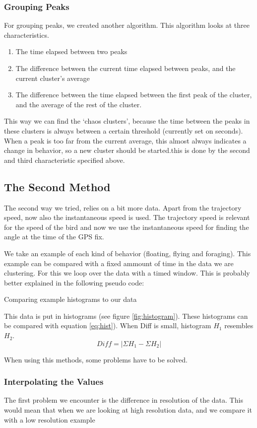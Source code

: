  \subsubsection{Grouping Peaks}
 For grouping peaks, we created another algorithm. This algorithm looks at three
 characteristics.  
 \begin{enumerate}
 \item The time elapsed between two peaks
 \item The difference between the current time elapsed between peaks, and the
 current cluster's average
 \item The difference between the time elapsed between the first peak of the
 cluster, and the average of the rest of the cluster.
 \end{enumerate}
 This way we can find the `chaos clusters', because the time between the peaks
 in these clusters is always between a certain threshold (currently set on
 \timeThreshold seconds). 
 When a peak is too far from the  current average, this almost always indicates
 a change in behavior, so a new cluster should be started.this is done by the
 second and third characteristic specified above.

\subsection{The Second Method}
The second way we tried, relies on a bit more data. Apart from the trajectory
speed, now also the instantaneous speed is used. The trajectory speed is relevant for
the speed of the bird and now we use the instantaneous speed for finding the angle
at the time of the GPS fix. 

We take an example of each kind of behavior (floating, flying and foraging).
This example can be compared with a fixed ammount of time in the data we are
clustering. For this we loop over the data with a timed window. This is probably
better explained in the following pseudo code:

\begin{algorithm}
\begin{algorithmic}
\ENDFOR
\end{algorithmic}
\caption{Comparing example histograms to our data}
\label{alg:hist}
\end{algorithm}


This data is put in histograms (see figure \ref{fig:histogram}). These
histograms can be compared with equation \ref{eq:hist}). When Diff is small,
histogram $H_1$ resembles $H_2$. 
\begin{equation}
 \label{eq:hist}
 Diff = \left| \Sigma H_1 - \Sigma H_2 \right|
\end{equation}

When using this methods, some problems have to be solved.

\subsubsection{Interpolating the Values}
The first problem we encounter is the difference in resolution of the data. This
would mean that when we are looking at high resolution data, and we compare it
with a low resolution example 
